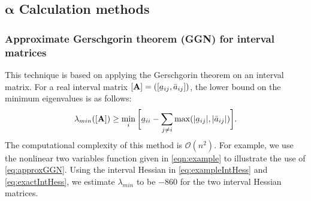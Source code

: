 \documentclass{elsarticle}
\numberwithin{equation}{section}
\newcommand{\ubar}[1]{\underaccent{\bar}{#1}}
\begin{document}
\subsection{\texorpdfstring{$\mathbf{\alpha}$ Calculation methods}{alpha Calculation methods}}
\label{sec:Methods}
\subsubsection{Approximate Gerschgorin theorem (GGN) for interval matrices}
This technique is based on applying the Gerschgorin theorem \cite{adjiman1996rigorous} on an interval matrix. For a real interval matrix $[ \mathbf{A} ] = ([\ubar{a}_{ij},\bar{a}_{ij}])$, the lower bound on the minimum eigenvalues is as follows:
\begin{equation}
    \lambda_{min}([\mathbf{A}]) \geq \min_i \bigg[\ubar{a}_{ii} - \sum_{j \neq i} \max ( |\ubar{a}_{ij}|,|\bar{a}_{ij}| ) \bigg].
    \label{eq:approxGGN}
\end{equation}
The computational complexity of this method is $\mathcal{O}(n^2)$. For example,  we use the nonlinear two variables function given in \eqref{eqn:example} to illustrate the use of \eqref{eq:approxGGN}. Using the interval Hessian in \eqref{eq:exampleIntHess} and \eqref{eq:exactIntHess}, we estimate $\lambda_{min}$ to be $-860$ for the two interval Hessian matrices.
\end{document}
